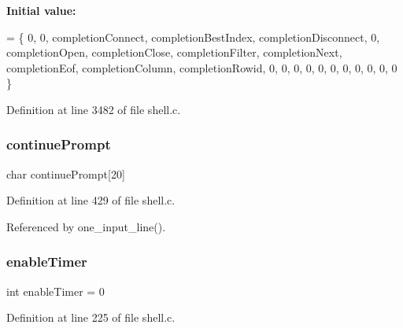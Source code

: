 {\bfseries Initial value\+:}
\begin{DoxyCode}
= \{
  0,                         
  0,                         
  completionConnect,         
  completionBestIndex,       
  completionDisconnect,      
  0,                         
  completionOpen,            
  completionClose,           
  completionFilter,          
  completionNext,            
  completionEof,             
  completionColumn,          
  completionRowid,           
  0,                         
  0,                         
  0,                         
  0,                         
  0,                         
  0,                         
  0,                         
  0,                         
  0,                         
  0,                         
  0                          
\}
\end{DoxyCode}


Definition at line 3482 of file shell.\+c.

\mbox{\label{shell_8c_acf98b01fc34a1bbc4f7d61f3ae62b6da}} 
\subsubsection{continue\+Prompt}
{\footnotesize\ttfamily char continue\+Prompt[20]\hspace{0.3cm}{\ttfamily [static]}}



Definition at line 429 of file shell.\+c.



Referenced by one\+\_\+input\+\_\+line().

\mbox{\label{shell_8c_ac8a1f6112bb3b4327605130a551d8dc4}} 
\subsubsection{enable\+Timer}
{\footnotesize\ttfamily int enable\+Timer = 0\hspace{0.3cm}{\ttfamily [static]}}



Definition at line 225 of file shell.\+c.

\mbox{\label{shell_8c_a27e0c7d1e426e994d47c8f67f6e1dcf6}} 
